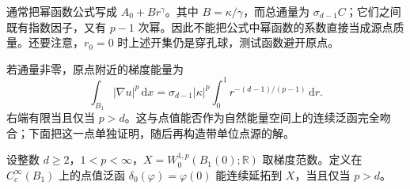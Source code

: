 通常把幂函数公式写成 \(A_0+Br^\gamma\)。其中 \(B=\kappa/\gamma\)，而总通量为 \(\sigma_{d-1}C\)；它们之间既有指数因子，又有 \(p-1\) 次幂。因此不能把公式中幂函数的系数直接当成源点质量。还要注意，\(r_0=0\) 时上述开集仍是穿孔球，测试函数避开原点。

\ProseParagraphBreak

若通量非零，原点附近的梯度能量为
\[
 \int_{B_1}|\nabla u|^p\,\mathrm dx
 =\sigma_{d-1}|\kappa|^p
       \int_0^1r^{-(d-1)/(p-1)}\,\mathrm dr.
\]
右端有限当且仅当 \(p>d\)。这与点值能否作为自然能量空间上的连续泛函完全吻合；下面把这一点单独证明，随后再构造带单位点源的解。

\begin{proposition}[点源属于自然对偶空间的阈值]
\label{b2:prop:H2-point-evaluation}
设整数 \(d\ge2\)，\(1<p<\infty\)，\(X=W_0^{1,p}(B_1(0);\mathbb R)\) 取梯度范数。定义在 \(C_c^\infty(B_1)\) 上的点值泛函 \(\delta_0(\varphi)=\varphi(0)\) 能连续延拓到 \(X\)，当且仅当 \(p>d\)。
\end{proposition}
